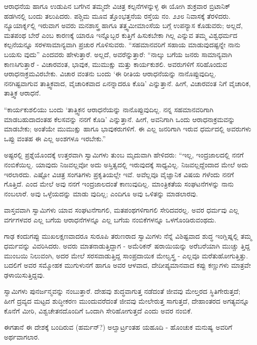 ಆರಾಧನೆಯ ಹಾಗೂ ಉಡುಪಿನ ಬಗೆಗಿನ ತಮ್ಮದೇ ವಿಚಿತ್ರ ಕಲ್ಪನೆಗಳನ್ನುಳ್ಳ ಈ ಯೋಗಿ ಶುಕ್ರವಾರ ಬ್ರಿಟಾನಿಕ್ ಹಡಗಿನಲ್ಲಿ ಬಂದು ತಲುಪಿದರು. ಪಶ್ಚಿಮ ಮೂವ ತ್ತೊಂಭತ್ತನೆಯ ರಸ್ತೆಯ ನಂ. ೨೨೮ ನಿವಾಸಕ್ಕೆ ತೆರಳಿದರು. ನ್ಯೂಯಾರ್ಕ್ನಲ್ಲಿ ಇರುವಾಗ ಅವರು ಮನಶಾಸ್ತ್ರ ಹಾಗೂ ತತ್ತ್ವಮೀಮಾಂಸೆಯ ಬಗ್ಗೆ ಉಪನ್ಯಾಸ ಕೊಡುವರು; ಅಲ್ಲದೆ, ಮತಪಂಥ ಬೇರೆ ಎಂಬ ಕಾರಣಕ್ಕೆ ಯಾರೂ ಇನ್ನೊಬ್ಬರ ಕುತ್ತಿಗೆ ಹಿಸುಕಬೇಕಾ ಗಿಲ್ಲ ಎನ್ನುವ ತಮ್ಮ ವಿಶ್ವಧರ್ಮದ ಕಲ್ಪನೆಯನ್ನೂ ಸರಳಸಾಮಾನ್ಯವಾಗಿ ಪ್ರಚುರ ಗೊಳಿಸುವರು. “ಸಹಮಾನವರಿಗೆ ಸಹಾಯ ಮಾಡುವುದಷ್ಟನ್ನೇ ನಾನು ಬಯಸು ವುದು” ಎಂದವರು ಹೇಳುತ್ತಾರೆ. ಅಲ್ಲದೆ, ಅವರೆನ್ನುತ್ತಾರೆ: “ನಾಲ್ಕು ಬಗೆಯ ಜನರು ಸಾಮಾನ್ಯವಾಗಿ ಕಾಣಸಿಗುತ್ತಾರೆ - ವಿಚಾರವಂತ, ಭಾವುಕ, ಮುಮುಕ್ಷು ಮತ್ತು ಕಾರ್ಯಕುಶಲಿ. ಅವರುಗಳಿಗೆ ಸರಿಹೊಂದುವ ಆರಾಧನಾಕ್ರಮವಿರಬೇಕು. ವಿಚಾರ ವಂತನು ಬಂದು ‘ಈ ರೀತಿಯ ಆರಾಧನೆಯನ್ನು ನಾನೊಪ್ಪುವುದಿಲ್ಲ. ನನಗಿಷ್ಟವಾಗುವ ತಾತ್ತ್ವಿಕವಾದ, ವೈಚಾರಿಕವಾದ ಏನನ್ನಾದರೂ ಕೊಡಿ’ ಎನ್ನುತ್ತಾನೆ. ಹೀಗೆ, ವಿಚಾರವಂತ ನಿಗೆ ವೈಚಾರಿಕ, ತಾತ್ತ್ವಿಕ ಆರಾಧನೆ.

“ಕಾರ್ಯಕುಶಲಿಯು ಬಂದು ‘ತಾತ್ತ್ವಿಕನ ಆರಾಧನೆಯನ್ನು ನಾನೊಪ್ಪುವುದಿಲ್ಲ. ನನ್ನ ಸಹಮಾನವರಿಗಾಗಿ ಮಾಡಬಹುದಾದಂತಹ ಕೆಲಸವನ್ನು ನನಗೆ ಕೊಡಿ’ ಎನ್ನುತ್ತಾನೆ. ಹೀಗೆ, ಅವನಿಗಾಗಿ ಒಂದು ಆರಾಧನಾಕ್ರಮವನ್ನು ಮಾಡಬೇಕು; ಅಂತೆಯೇ ಮುಮುಕ್ಷು ಹಾಗೂ ಭಾವುಕರುಗಳಿಗೆ. ಈ ಎಲ್ಲ ಜನರಿಗಾಗಿ ಇರುವ ಧರ್ಮದಲ್ಲಿ ಅವರುಗಳು ಒಪ್ಪು ವಂತಹ ಈ ಎಲ್ಲ ಅಂಶಗಳೂ ಇರಬೇಕು.”

ಅಷ್ಟರಲ್ಲಿ ಪ್ರಶ್ನೆಯೊಂದಕ್ಕೆ ಉತ್ತರವಾಗಿ ಸ್ವಾಮಿಗಳು ತುಂಬ ಮೃದುವಾಗಿ ಹೇಳಿದರು: “ಇಲ್ಲ, ಇಂದ್ರಜಾಲದಲ್ಲಿ ನನಗೆ ನಂಬಿಕೆಯಿಲ್ಲ. ಯಾವುದು ನಿಜವಲ್ಲವೋ ಅದು ಅಸ್ತಿತ್ವದಲ್ಲಿ ಇರುವುದಕ್ಕೆ ಸಾಧ್ಯವಿಲ್ಲ. ನಿಜವಲ್ಲದ್ದೆಂದಾದ ಮೇಲೆ ಅದು ಇರಲಾರದು. ಎಷ್ಟೋ ವಿಚಿತ್ರ ಸಂಗತಿಗಳು ಪ್ರಕೃತಿಯಲ್ಲೇ ಇವೆ. ಅವೆಲ್ಲವೂ ವೈಜ್ಞಾನಿಕ ವಿಷಯ ಗಳೆಂದು ನನಗೆ ಗೊತ್ತಿದೆ. ಎಂದ ಮೇಲೆ ಅವು ನನಗೆ ಇಂದ್ರಜಾಲದಂತೆ ಕಾಣುವುದಿಲ್ಲ. ಮಾಂತ್ರಿಕತೆಯ ಸಂಘಟನೆಗಳನ್ನು ನಾನು ನಂಬಲಾರೆ. ಅವು ಒಳ್ಳೆಯದನ್ನು ಮಾಡು ವುದಿಲ್ಲ; ಎಂದಿಗೂ ಅವು ಒಳಿತನ್ನು ಮಾಡಲಾರವು.

ವಾಸ್ತವವಾಗಿ ಸ್ವಾಮಿಗಳು ಯಾವ ಸಂಘಟನೆಗಾಗಲಿ, ಮತಪಂಥಗಳಿಗಾಗಲಿ ಸೇರಿದವರಲ್ಲ. ಅವರ ಧರ್ಮವು ಎಲ್ಲ ವರ್ಗಗಳವರ ಎಲ್ಲ ಬಗೆಯ ಆರಾಧನೆಗಳನ್ನೂ ಎಲ್ಲ ಬಗೆಯ ನಂಬಿಕೆಗಳನ್ನೂ ಒಳಗೊಂಡಿರುವಂಥದು.

ಗಾಢ ಕಂದುಗಪ್ಪು ಮುಖಲಕ್ಷಣವಾದರೂ ಸುರೂಪಿ ತರುಣರಾದ ಸ್ವಾಮಿಗಳು ನೆನ್ನೆ ವಿಶಿಷ್ಟವಾದ ಶುದ್ಧ ಇಂಗ್ಲಿಷ್ನಲ್ಲಿ ತಮ್ಮ ಧರ್ಮವನ್ನು ವಿವರಿಸಿದರು. ಅವರು ಮಾತನಾಡುತ್ತಿದ್ದಾಗ - ಅಮೆರಿಕನ್ ಷರಾಯಿಯನ್ನು ಅರೆಬರೆಯಾಗಿ ಮುಚ್ಚು ತ್ತಿದ್ದ ಮುಂಬಯಿ ನಿಲುವಂಗಿ, ಅದರ ಮೇಲೆ ಸರಸವಾಡುತ್ತಿದ್ದ ಸಾಂಪ್ರದಾಯಿಕ ಮೇಲ್ವಸ್ತ್ರ - ಎಲ್ಲವೂ ಮರೆತುಹೋಗುತ್ತಿತ್ತು. ಬದಲಿಗೆ ಅವರ ಸಮ್ಮೋಹಕ ಮುಗುಳುನಗೆ ಹಾಗೂ ಅವರ ಆಳವಾದ, ದೇದೀಪ್ಯಮಾನವಾದ ಕಪ್ಪು ಕಣ್ಣುಗಳು ಮಾತ್ರವೇ ಢಳಾಯಿಸುತ್ತಿದ್ದವು.

ಸ್ವಾಮಿಗಳು ಪುನರ್ಜನ್ಮವನ್ನು ನಂಬುತ್ತಾರೆ. ದೇಹವು ಶುದ್ಧವಾಗುತ್ತ ನಡೆದಂತೆ ಜೀವವು ಮೇಲ್ತರದ ಸ್ಥಿತಿಗೇರುತ್ತದೆ; ಹೀಗೆ ದ್ರವ್ಯದ ಮಟ್ಟದ ಶುದ್ಧೀಕರಣ ಮುಂದುವರೆದಂತೆ ಜೀವವು ಮೇಲೇರುತ್ತ ಸಾಗುತ್ತದೆ, ದೇಹಾಂತರದ ಅಗತ್ಯವನ್ನೂ ಕೊನೆಗೆ ಮೀರಿ, ವಿಶ್ವಚೇತನದೊಂದಿಗೆ ಒಂದಾಗಿ ಸೇರಿಹೋಗುತ್ತದೆ ಎಂದು ಅವರ ನಂಬಿಕೆ.

ಈಗತಾನೆ ಈ ದೇಶಕ್ಕೆ ಬಂದಿರುವ (ಹರ್ಮನ್?) ಅಲ್ವಾರ್ಟ್ರಂತಹ ಯಹೂದಿ - ಹೊಂಚುಕ ಮನುಷ್ಯ ಅವರಿಗೆ ಅರ್ಥವಾಗಲಾರ.

